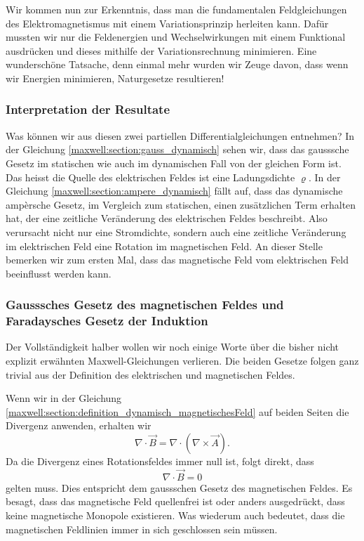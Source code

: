 Wir kommen nun zur Erkenntnis, dass man die fundamentalen Feldgleichungen des Elektromagnetismus mit einem Variationsprinzip herleiten kann.
Dafür mussten wir nur die Feldenergien und Wechselwirkungen mit einem Funktional ausdrücken und dieses mithilfe der Variationsrechnung minimieren.
Eine wunderschöne Tatsache, denn einmal mehr wurden wir Zeuge davon, dass wenn wir Energien minimieren, Naturgesetze resultieren!

\subsubsection{Interpretation der Resultate}
Was können wir aus diesen zwei partiellen Differentialgleichungen entnehmen?
In der Gleichung \eqref{maxwell:section:gauss_dynamisch} sehen wir, dass das gausssche Gesetz im statischen wie auch im dynamischen Fall von der gleichen Form ist.
Das heisst die Quelle des elektrischen Feldes ist eine Ladungsdichte $\varrho$.
In der Gleichung \eqref{maxwell:section:ampere_dynamisch} fällt auf, dass das dynamische ampèrsche Gesetz, im Vergleich zum statischen, einen zusätzlichen Term erhalten hat, der eine zeitliche Veränderung des elektrischen Feldes beschreibt.
Also verursacht nicht nur eine Stromdichte, sondern auch eine zeitliche Veränderung im elektrischen Feld eine Rotation im magnetischen Feld.
An dieser Stelle bemerken wir zum ersten Mal, dass das magnetische Feld vom elektrischen Feld beeinflusst werden kann.


\subsubsection{Gausssches Gesetz des magnetischen Feldes und Faradaysches Gesetz der Induktion}
Der Vollständigkeit halber wollen wir noch einige Worte über die bisher nicht explizit erwähnten Maxwell-Gleichungen verlieren.
Die beiden Gesetze folgen ganz trivial aus der Definition des elektrischen und magnetischen Feldes.
 
Wenn wir in der Gleichung \eqref{maxwell:section:definition_dynamisch_magnetischesFeld} auf beiden Seiten die Divergenz anwenden, erhalten wir
\[
\nabla \cdot \vec{B}
=
\nabla \cdot (\nabla \times \vec{A}).
\]
Da die Divergenz eines Rotationsfeldes immer null ist, folgt direkt, dass
\begin{equation}
\nabla \cdot \vec{B}
=
0
\label{maxwell:section:Gauss_magnetisches_Feld}
\end{equation}
gelten muss.
Dies entspricht dem gaussschen Gesetz des magnetischen Feldes.
Es besagt, dass das magnetische Feld quellenfrei ist oder anders ausgedrückt, dass keine magnetische Monopole existieren. Was wiederum auch bedeutet, dass die magnetischen Feldlinien immer in sich geschlossen sein müssen.
 
